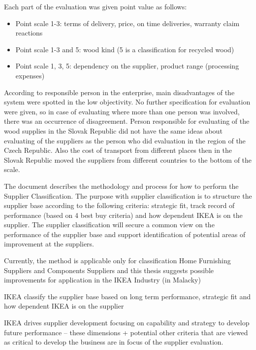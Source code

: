 \documentclass[oneside,12pt]{article}%
\begin{document}

Each part of the evaluation was given point value as follows:

\begin{itemize}
  \item Point scale 1-3: terms of delivery, price, on time deliveries, warranty claim reactions
  \item Point scale 1-3 and 5: wood kind (5 is a classification for recycled wood)
  \item Point scale 1, 3, 5:  dependency on the supplier, product range (processing expenses)
\end{itemize}

According to responsible person in the enterprise, main disadvantages of the system were spotted in the low objectivity. No further specification for evaluation were given, so in case of evaluating where more than one person was involved, there was an occurrence of disagreement. Person responsible for evaluating of the wood supplies in the Slovak Republic did not have the same ideas about evaluating of the suppliers as the person who did evaluation in the region of the Czech Republic. Also the cost of transport from different places then in the Slovak Republic moved the suppliers from different countries to the bottom of the scale.

The document describes the methodology and process for how to perform the Supplier Classification. The purpose with supplier classification is to structure the supplier base according to the following criteria: strategic fit, track record of performance (based on 4 best buy criteria) and how dependent IKEA is on the supplier. The supplier classification will secure a common view on the performance of the supplier base and support identification of potential areas of improvement at the suppliers. \par
Currently, the method is applicable only for classification Home Furnishing Suppliers and Components Suppliers and this thesis suggests possible improvements for application in the IKEA Industry (in Malacky)\par
IKEA classify the supplier base based on long term performance, strategic fit and how dependent IKEA is on the supplier \par
IKEA drives supplier development focusing on capability and strategy to develop future performance – these dimensions + potential other criteria that are viewed as critical to develop the business are in focus of the supplier evaluation.
\end{document}
